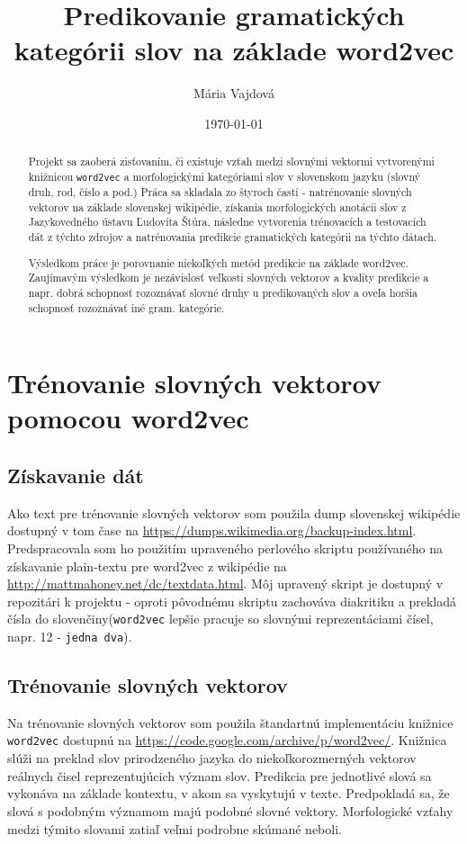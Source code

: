 \documentclass[12pt]{article}
\title{Predikovanie gramatických kategórii slov na základe word2vec}
\author{
        Mária Vajdová
}
\date{\today}
\begin{document}
\maketitle

\begin{abstract}

Projekt sa zaoberá zisťovaním, či existuje vzťah medzi slovnými vektormi vytvorenými knižnicou \texttt{word2vec} 
a morfologickými kategóriami slov v slovenskom jazyku (slovný druh, rod, číslo a pod.) Práca sa skladala zo štyroch častí - 
natrénovanie slovných vektorov na základe slovenskej wikipédie, získania morfologických anotácii slov z Jazykovedného ústavu Ľudovíta Štúra, následne vytvorenia trénovacích a testovacích dát z týchto zdrojov a natrénovania predikcie gramatických kategórii na týchto dátach.

Výsledkom práce je porovnanie niekoľkých metód predikcie na základe word2vec. Zaujímavým výsledkom je nezávislosť veľkosti slovných vektorov a kvality predikcie a napr. dobrá schopnosť rozoznávať slovné druhy u predikovaných slov a oveľa horšia schopnosť rozoznávať iné gram. kategórie. 

\end{abstract}

\section{Trénovanie slovných vektorov pomocou word2vec}
\subsection{Získavanie dát}
Ako text pre trénovanie slovných vektorov som použila dump slovenskej wikipédie dostupný v tom čase na \url{https://dumps.wikimedia.org/backup-index.html}. Predspracovala som ho použitím upraveného perlového skriptu používaného na získavanie plain-textu pre word2vec z wikipédie na \url{http://mattmahoney.net/dc/textdata.html}. Môj upravený skript je dostupný v repozitári k projektu - oproti pôvodnému skriptu zachováva diakritiku a prekladá čísla do slovenčiny(\texttt{word2vec} lepšie pracuje so slovnými reprezentáciami čísel, napr. 12 - \texttt{jedna dva}). 

\subsection{Trénovanie slovných vektorov}
Na trénovanie slovných vektorov som použila štandartnú implementáciu knižnice \texttt{word2vec} dostupnú na \url{https://code.google.com/archive/p/word2vec/}. Knižnica slúži na preklad slov prirodzeného jazyka do niekoľkorozmerných vektorov reálnych čisel reprezentujúcich význam slov. Predikcia pre jednotlivé slová sa vykonáva na základe kontextu, v akom sa vyskytujú v texte. Predpokladá sa, že slová s podobným významom majú podobné slovné vektory. Morfologické vzťahy medzi týmito slovami zatiaľ veľmi podrobne skúmané neboli. 
\end{document}
